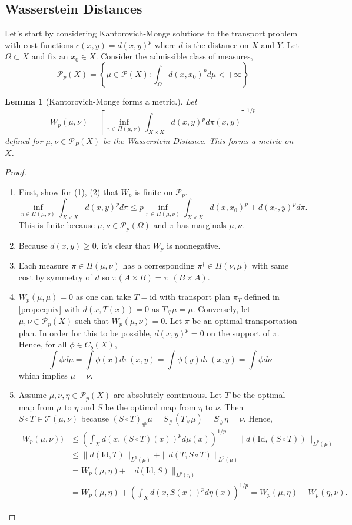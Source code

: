 \documentclass[12pt]{article}
\theoremstyle{plain}
\newtheorem{lem}{Lemma}[section]
\numberwithin{equation}{section}
\begin{document}
\subsection{Wasserstein Distances}
Let's start by considering Kantorovich-Monge solutions to the transport problem with cost functions $c(x,y) = d(x,y)^p$ where $d$ is the distance on $X$ and $Y$.
Let $\Omega\subset X$ and fix an $x_0\in X$. Consider the admissible class of measures,
\[\mathcal{P}_p(X) = \left\{\mu\in\mathcal{P}(X):\int_{\Omega}d(x,x_0)^pd\mu < +\infty\right\}\]
\begin{lem}[Kantorovich-Monge forms a metric.]\label{lem:wass}
	Let \[W_p(\mu,\nu) = \left[\inf_{\pi\in\Pi(\mu,\nu)}\int_{X\times X}d(x,y)^pd\pi(x,y)\right]^{1/p}\] defined for $\mu,\nu\in\mathcal{P}_P(X)$ be the Wasserstein Distance. This forms a metric on $X$.
\end{lem}
\begin{proof}
  \begin{enumerate}
    \item First, show for (1), (2) that $W_p$ is finite on $\mathcal{P}_p$.
    \begin{equation*}\inf_{\pi\in\Pi(\mu,\nu)}\int_{X\times X}d(x,y)^pd\pi \le p\inf_{\pi\in\Pi(\mu,\nu)}\int_{X\times X}d(x,x_0)^p + d(x_0,y)^pd\pi.\end{equation*}
    This is finite because $\mu,\nu\in \mathcal{P}_p(\Omega)$ and $\pi$ has marginals $\mu,\nu$.
    \item Because $d(x,y) \ge 0$, it's clear that $W_p$ is nonnegative. 
    \item Each measure $\pi\in\Pi(\mu,\nu)$ has a corresponding $\pi^\dagger \in \Pi(\nu,\mu)$ with same cost by symmetry of $d$ so $\pi(A\times B) = \pi^\dagger(B\times A)$.
    \item  $W_p(\mu,\mu) = 0$ as one can take $T = \text{id}$ with transport plan $\pi_T$ defined in \autoref{prop:equiv} with $d(x,T(x)) = 0$ as $T_\# \mu = \mu$. Conversely, let $\mu,\nu\in \mathcal{P}_p(X)$ such that $W_p(\mu,\nu) = 0$. Let $\pi$ be an optimal transportation plan. 
    In order for this to be possible, $d(x,y)^p= 0$ on the support of $\pi$. Hence, for all $\phi\in C_b(X)$,
    \[ \int \phi d\mu = \int \phi(x)d\pi(x,y) = \int\phi(y)d\pi(x,y) = \int\phi d\nu\]
    which implies $\mu=\nu$.
    \item   Assume $\mu,\nu,\eta\in \mathcal{P}_p(X)$ are absolutely continuous. Let $T$ be the optimal map from $\mu$ to $\eta$ and $S$ be the optimal map from $\eta$ to $\nu$.
    Then $S\circ T\in \mathcal{T}(\mu,\nu)$ because $(S\circ T)_\#\mu = S_\#(T_\#\mu) = S_\#\eta = \nu$. Hence,
    \begin{align*}
      W_p(\mu,\nu)) &\le \left(\int_Xd(x,(S\circ T)(x))^pd\mu(x)\right)^{1/p} = \|d(\text{Id},(S\circ T))\|_{L^p(\mu)} \\
      &\le \|d(\text{Id},T)\|_{L^p(\mu)} + \|d(T, S\circ T)\|_{L^p(\mu)} \\
      &= W_p(\mu,\eta) + \|d(\text{Id}, S)\|_{L^p(\eta)} \\
      &= W_p(\mu,\eta) + \left(\int_{X}d(x,S(x))^pd\eta(x)\right)^{1/p} = W_p(\mu,\eta) + W_p(\eta,\nu).
      \end{align*}
  \end{enumerate}
\end{proof}
\end{document}
